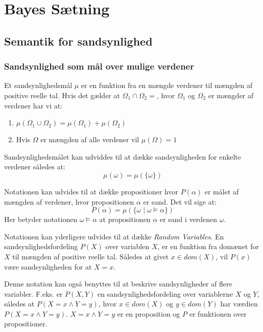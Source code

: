 \section{Bayes Sætning}


\subsection{Semantik for sandsynlighed}

\subsubsection{Sandsynlighed som mål over mulige verdener}

Et sandsynlighedsmål $\mu$ er en funktion fra en mængde verdener til mængden af positive reelle tal. 
Hvis det gælder at $\Omega_1 \cap \Omega_2 = {}$, hvor $\Omega_1$ og $\Omega_2$ er mængder af verdener har vi at:
\begin{enumerate}
\item $\mu(\Omega_1 \cup \Omega_2) = \mu(\Omega_1) + \mu(\Omega_2)$
\item Hvis $\Omega$ er mængden af alle verdener vil $\mu(\Omega) = 1$ 
\end{enumerate}

Sandsynlighedsmålet kan udviddes til at dække sandsynligheden for enkelte verdener således at:
$$\mu(\omega) = \mu(\{\omega\})$$

Notationen kan udvides til at dække propositioner hvor $P(\alpha)$ er målet af mængden af verdener, hvor propositionen $\alpha$ er sand.
Det vil sige at:
$$P(\alpha) = \mu(\{\omega \mid \omega \models \alpha \})$$
Her betyder notationen $\omega \models \alpha$ at propositionen $\alpha$ er sand i verdenen $\omega$.

Notationen kan yderligere udvides til at dække \emph{Random Variables}.
En sandsynlighedsfordeling $P(X)$ over variablen $ X $, er en funktion fra
domænet for $ X $ til mængden af positive reelle tal.
Således at givet $x \in dom(X)$, vil $P(x)$ være sandsynligheden for at $X = x$.

Denne notation kan også benyttes til at beskrive sandsynligheder af flere variabler.
F.eks. er $P(X,Y)$ en sandsynlighedsfordeling over variablerne $ X $ og $ Y $, således at $P(X = x \wedge Y = y)$, hvor $x \in dom(X)$ og $y \in dom(Y)$ har værdien $P(X = x \wedge Y = y)$.
$X = x \wedge Y = y$ er en proposition og $ P $ er funktionen over propositioner. 

